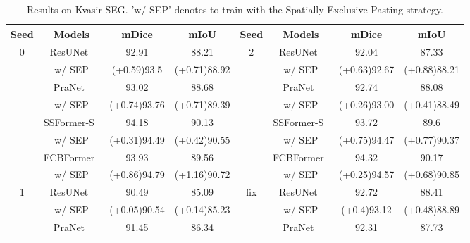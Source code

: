 \documentclass{article}
\begin{document}
\begin{table*}[tbp]
\begin{center}
    \caption{Results on Kvasir-SEG. 'w/ SEP' denotes to train with the Spatially Exclusive Pasting strategy.}\label{tab:kvasir}
\begin{tabular}{c|c|cc|c|c|cc}
\hline\hline
Seed & Models & mDice & mIoU & Seed& Models &  mDice & mIoU \\ \hline
\multirow{8}{*}{0}  & 
ResUNet~\cite{resunet} &92.91&88.21  
&\multirow{8}{*}{2} 
&ResUNet~\cite{resunet}&92.04&87.33 \\
                    & w/ SEP &\textcolor[rgb]{0,0,1}{(+0.59)}93.5&\textcolor[rgb]{0,0,1}{(+0.71)}88.92 && w/ SEP &\textcolor[rgb]{0,0,1}{(+0.63)}92.67&\textcolor[rgb]{0,0,1}{(+0.88)}88.21\\ 
                     \cline{2-4} \cline{6-8}
                    & PraNet~\cite{pranet} &93.02&88.68 && PraNet~\cite{pranet} &92.74&88.08  \\ 
                    & w/ SEP &\textcolor[rgb]{0,0,1}{(+0.74)}93.76&\textcolor[rgb]{0,0,1}{(+0.71)}89.39 && w/ SEP &\textcolor[rgb]{0,0,1}{(+0.26)}93.00&\textcolor[rgb]{0,0,1}{(+0.41)}88.49 \\ 
                    \cline{2-4} \cline{6-8}
                    & SSFormer-S~\cite{ssformer}&94.18&90.13 & & SSFormer-S~\cite{ssformer}&93.72&89.6 \\
                    & w/ SEP &\textcolor[rgb]{0,0,1}{(+0.31)}94.49&\textcolor[rgb]{0,0,1}{(+0.42)}90.55 && w/ SEP &\textcolor[rgb]{0,0,1}{(+0.75)}94.47&\textcolor[rgb]{0,0,1}{(+0.77)}90.37\\ 
                    \cline{2-4} \cline{6-8}
\cline{2-4} \cline{6-8}
                    & FCBFormer~\cite{FCBFormer}&93.93&89.56 & & FCBFormer~\cite{FCBFormer}&94.32&90.17\\
                    & w/ SEP &\textcolor[rgb]{0,0,1}{(+0.86)}94.79&\textcolor[rgb]{0,0,1}{(+1.16)}90.72 & & w/ SEP &\textcolor[rgb]{0,0,1}{(+0.25)}94.57&\textcolor[rgb]{0,0,1}{(+0.68)}90.85\\
                    \hline\hline
\multirow{8}{*}{1}  & ResUNet~\cite{resunet} &90.49&85.09  &\multirow{8}{*}{fix} &ResUNet~\cite{resunet} &92.72&88.41 \\
                    & w/ SEP &\textcolor[rgb]{0,0,1}{(+0.05)}90.54&\textcolor[rgb]{0,0,1}{(+0.14)}85.23 && w/ SEP &\textcolor[rgb]{0,0,1}{(+0.4)}93.12&\textcolor[rgb]{0,0,1}{(+0.48)}88.89\\ 
                    \cline{2-4} \cline{6-8}
                    & PraNet~\cite{pranet} &91.45&86.34 && PraNet~\cite{pranet} &92.31&87.73  \\ 

\end{tabular}
\end{center}
\end{table*}
\end{document}
